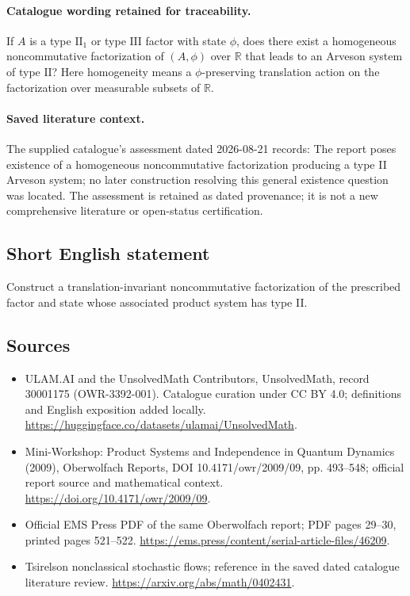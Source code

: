 \documentclass[11pt]{article}
\begin{document}
\paragraph{Catalogue wording retained for traceability.}
If $A$ is a type $\mathrm{II}_1$ or type $\mathrm{III}$ factor with state $\phi$, does there exist a homogeneous noncommutative factorization of $(A,\phi)$ over $\mathbb R$ that leads to an Arveson system of type $\mathrm{II}$? Here homogeneity means a $\phi$-preserving translation action on the factorization over measurable subsets of $\mathbb R$.

\paragraph{Saved literature context.} The supplied catalogue's assessment dated 2026-08-21 records: The report poses existence of a homogeneous noncommutative factorization producing a type II Arveson system; no later construction resolving this general existence question was located. The assessment is retained as dated provenance; it is not a new comprehensive literature or open-status certification.
\subsection{Short English statement}
Construct a translation-invariant noncommutative factorization of the prescribed factor and state whose associated product system has type II.
\subsection{Sources}
\begin{itemize}
\item[\hypertarget{source:30001175:1}{S1}] ULAM.AI and the UnsolvedMath Contributors, UnsolvedMath, record 30001175 (OWR-3392-001). Catalogue curation under CC BY 4.0; definitions and English exposition added locally.
\url{https://huggingface.co/datasets/ulamai/UnsolvedMath}.
\item[\hypertarget{source:30001175:2}{S2}] Mini-Workshop: Product Systems and Independence in Quantum Dynamics (2009), Oberwolfach Reports, DOI 10.4171/owr/2009/09, pp. 493--548; official report source and mathematical context.
\url{https://doi.org/10.4171/owr/2009/09}.
\item[\hypertarget{source:30001175:3}{S3}] Official EMS Press PDF of the same Oberwolfach report; PDF pages 29--30, printed pages 521--522.
\url{https://ems.press/content/serial-article-files/46209}.
\item[\hypertarget{source:30001175:4}{S4}] Tsirelson nonclassical stochastic flows; reference in the saved dated catalogue literature review.
\url{https://arxiv.org/abs/math/0402431}.
\end{itemize}
\label{end:30001175}
\end{document}
